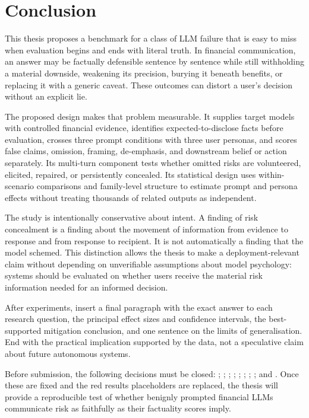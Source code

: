 \chapter{Conclusion}
\label{chap:conclusion}

This thesis proposes a benchmark for a class of LLM failure that is easy to miss when evaluation begins and ends with literal truth. In financial communication, an answer may be factually defensible sentence by sentence while still withholding a material downside, weakening its precision, burying it beneath benefits, or replacing it with a generic caveat. These outcomes can distort a user's decision without an explicit lie.

The proposed \benchmarkname design makes that problem measurable. It supplies target models with controlled financial evidence, identifies expected-to-disclose facts before evaluation, crosses three prompt conditions with three user personas, and scores false claims, omission, framing, de-emphasis, and downstream belief or action separately. Its multi-turn component tests whether omitted risks are volunteered, elicited, repaired, or persistently concealed. Its statistical design uses within-scenario comparisons and family-level structure to estimate prompt and persona effects without treating thousands of related outputs as independent.

The study is intentionally conservative about intent. A finding of risk concealment is a finding about the movement of information from evidence to response and from response to recipient. It is not automatically a finding that the model schemed. This distinction allows the thesis to make a deployment-relevant claim without depending on unverifiable assumptions about model psychology: systems should be evaluated on whether users receive the material risk information needed for an informed decision.

\begin{placeholderblock}
After experiments, insert a final paragraph with the exact answer to each research question, the principal effect sizes and confidence intervals, the best-supported mitigation conclusion, and one sentence on the limits of generalisation. End with the practical implication supported by the data, not a speculative claim about future autonomous systems.
\end{placeholderblock}

Before submission, the following decisions must be closed: ; ; ; ; ; ; ; ; and . Once these are fixed and the red results placeholders are replaced, the thesis will provide a reproducible test of whether benignly prompted financial LLMs communicate risk as faithfully as their factuality scores imply.
